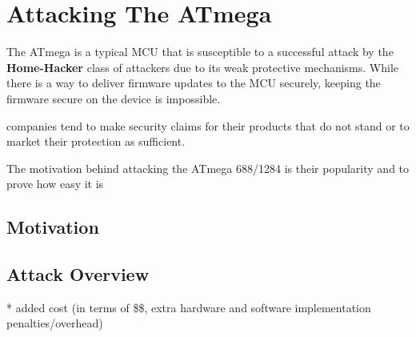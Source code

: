 \section{Attacking The ATmega}
\label{sec:attacking_mega}

The ATmega is a typical MCU that is susceptible to a successful attack by the \textbf{Home-Hacker} class of attackers due to its weak protective mechanisms. While there is a way to deliver firmware updates to the MCU securely\citep{tech:aes_bls}, keeping the firmware secure on the device is impossible.

companies tend to make security claims for their products that do not stand or to market their protection as sufficient\citep{sergei:thesis}.

The motivation behind attacking the ATmega 688/1284 is their popularity and to prove how easy it is


	\subsection{Motivation}
	
	\subsection{Attack Overview}
		* added cost (in terms of \$\$, extra hardware and software implementation penalties/overhead)